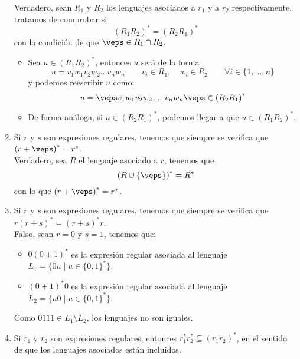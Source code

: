 \begin{enumerate}
        Verdadero, sean $R_1$ y $R_2$ los lenguajes asociados a $r_1$ y a $r_2$ respectivamente, tratamos de comprobar si
        \begin{equation*}
            {(R_1R_2)}^{\ast} = {(R_2R_1)}^{\ast}
        \end{equation*}
        con la condición de que $\veps \in R_1 \cap R_2$.
        \begin{itemize}
            \item Sea $u\in {(R_1R_2)}^{\ast}$, entonces $u$ será de la forma
                \begin{equation*}
                    u = v_1w_1v_2w_2\ldots v_nw_n \qquad v_i \in R_1, \quad w_i \in R_2 \qquad \forall i \in \{1,\ldots,n\}
                \end{equation*}
                y podemos reescribir $u$ como:
                \begin{equation*}
                    u = \veps v_1w_1v_2w_2 \ldots v_nw_n\veps \in {(R_2R_1)}^{\ast}
                \end{equation*}
            \item De forma análoga, si $u\in {(R_2R_1)}^{\ast}$, podemos llegar a que $u\in {(R_1R_2)}^{\ast}$.
        \end{itemize}
    \item Si $r$ y $s$ son expresiones regulares, tenemos que siempre se verifica que ${(r+\veps )}^{\ast}=r^\ast$.\\

        Verdadero, sea $R$ el lenguaje asociado a $r$, tenemos que
        \begin{equation*}
            {(R\cup \{\veps\})}^{\ast} = R^\ast
        \end{equation*}
        con lo que ${(r+\veps)}^{\ast}=r^\ast$.
    \item Si $r$ y $s$ son expresiones regulares, tenemos que siempre se verifica que $r{(r+s)}^{\ast}={(r+s)}^{\ast}r$.\\

        Falso, sean $r = 0$ y $s = 1$, tenemos que:
        \begin{itemize}
            \item $0{(0+1)}^{\ast}$ es la expresión regular asociada al lenguaje \newline$L_1=\{0u \mid u\in {\{0,1\}}^{\ast}\}$.
            \item ${(0+1)}^{\ast}0$ es la expresión regular asociada al lenguaje \newline$L_2 = \{u0 \mid u\in {\{0,1\}}^{\ast}\}$.
        \end{itemize}
        Como $0111 \in L_1\setminus L_2$, los lenguajes no son iguales.
    \item Si $r_1$ y $r_2$ son expresiones regulares, entonces $r_1^\ast r_2^\ast \subseteq {(r_1r_2)}^{\ast}$, en el sentido de que los lenguajes asociados están incluidos.\\


\end{enumerate}
